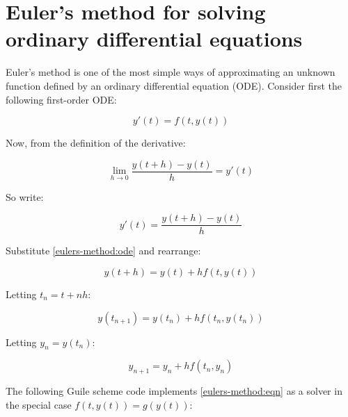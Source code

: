 \section{Euler's method for solving ordinary differential equations}

Euler's method is one of the most simple ways of approximating an
unknown function defined by an ordinary differential equation
(ODE). Consider first the following first-order ODE:

\begin{equation}
  \label{eulers-method:ode}
  y'\left(t\right) = f\left(t, y\left(t\right)\right)
\end{equation}

Now, from the definition of the derivative:

\begin{equation}
  \lim_{h\to0} \frac{y \left( t + h \right) - y \left( t \right)}{h} =
  y'\left(t\right)
\end{equation}

So write:

\begin{equation}
  y'\left(t\right) = \frac{y\left(t + h\right) - y\left(t\right)}{h}
\end{equation}

Substitute \ref{eulers-method:ode} and rearrange:

\begin{equation}
  y \left( t + h \right) = y\left(t\right) + h f \left( t, y \left( t
  \right) \right)
\end{equation}

Letting \(t_n = t + nh\):

\begin{equation}
  y \left( t_{n + 1} \right) = y \left( t_n \right) + h f \left( t_n,
  y \left( t_n \right) \right)
\end{equation}

Letting \(y_n = y \left( t_n \right) \):

\begin{equation}
  \label{eulers-method:eqn}
  y_{n + 1} = y_n + h f \left( t_n, y_n \right)
\end{equation}

The following Guile scheme code implements \ref{eulers-method:eqn} as
a solver in the special case \( f \left( t, y\left( t\right) \right) =
g \left( y \left( t \right) \right) \):



